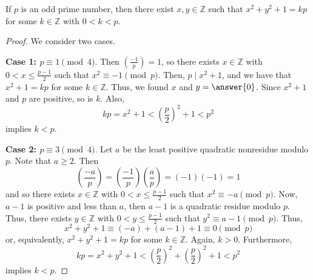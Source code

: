 \documentclass{ximera}
\begin{document}
\begin{theorem}
 If $p$ is an odd prime number, then there exist $x,y\in\mathbb{Z}$ such that $x^2+y^2+1=kp$ for some $k\in\mathbb{Z}$ with $0<k<p$.
\end{theorem}
\begin{proof}
 We consider two cases.
 
{\bf Case 1: $p\equiv 1\pmod 4$}. Then $\left(\frac{-1}{p}\right)=1$, so there exists $x\in\mathbb{Z}$ with $0<x\leq\frac{p-1}{2}$ such that $x^2\equiv -1 \pmod p$. Then, $p\mid x^2+1$, and we have that $x^2+1=kp$ for some $k\in\mathbb{Z}$. Thus, we found $x$ and $y=\answer{0}$. Since $x^2+1$ and $p$ are positive, so is $k$. Also, \[kp=x^2+1<\left(\frac{p}{2}\right)^2+1<p^2\] implies $k<p$.

{\bf Case 2: $p\equiv 3\pmod 4$}. Let $a$ be the least positive quadratic nonresidue modulo $p$. Note that $a\geq2$. Then \[\left(\frac{-a}{p}\right)=\left(\frac{-1}{p}\right)\left(\frac{a}{p}\right)=(-1)(-1)=1\] and so there exists $x\in\mathbb{Z}$ with $0<x\leq\frac{p-1}{2}$ such that $x^2\equiv -a \pmod p$. Now, $a-1$ is positive and less than $a$, then $a-1$ is a quadratic residue modulo $p$. Thus, there exists $y\in\mathbb{Z}$ with $0<y\leq\frac{p-1}{2}$ such that $y^2\equiv a-1 \pmod p$. Thus, \[x^2+y^2+1\equiv (-a)+(a-1)+1\equiv 0 \pmod p\] or, equivalently, $x^2+y^2+1=kp$ for some $k\in\mathbb{Z}$. Again, $k>0$. Furthermore, \[kp=x^2+y^2+1<\left(\frac{p}{2}\right)^2+\left(\frac{p}{2}\right)^2+1<p^2\] implies $k<p$. \qedhere
\end{proof}
\end{document}
